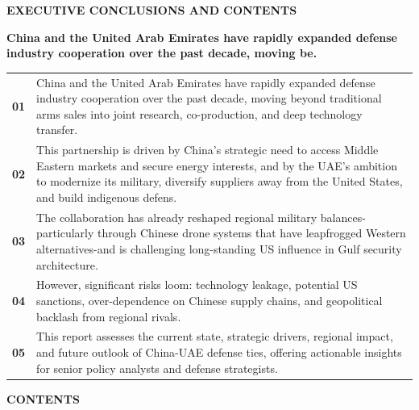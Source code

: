 \documentclass[10pt,a4paper]{article}
\begin{document}
{\textcolor{BOBlue}{\scriptsize\bfseries EXECUTIVE CONCLUSIONS AND CONTENTS}}\par\vspace{-1pt}
{\Large\sffamily\bfseries\color{BONavy} China and the United Arab Emirates have rapidly expanded defense industry cooperation over the past decade, moving be.}\par\vspace{4pt}
\vspace{2pt}{\color{BOBright}\rule{\linewidth}{1pt}}\vspace{5pt}
\begin{tabularx}{\linewidth}{p{12mm}Y}
\textcolor{BOBlue}{\bfseries 01} & {\footnotesize China and the United Arab Emirates have rapidly expanded defense industry cooperation over the past decade, moving beyond traditional arms sales into joint research, co-production, and deep technology transfer.} \\[4pt]
\textcolor{BOBlue}{\bfseries 02} & {\footnotesize This partnership is driven by China's strategic need to access Middle Eastern markets and secure energy interests, and by the UAE's ambition to modernize its military, diversify suppliers away from the United States, and build indigenous defens.} \\[4pt]
\textcolor{BOBlue}{\bfseries 03} & {\footnotesize The collaboration has already reshaped regional military balances-particularly through Chinese drone systems that have leapfrogged Western alternatives-and is challenging long-standing US influence in Gulf security architecture.} \\[4pt]
\textcolor{BOBlue}{\bfseries 04} & {\footnotesize However, significant risks loom: technology leakage, potential US sanctions, over-dependence on Chinese supply chains, and geopolitical backlash from regional rivals.} \\[4pt]
\textcolor{BOBlue}{\bfseries 05} & {\footnotesize This report assesses the current state, strategic drivers, regional impact, and future outlook of China-UAE defense ties, offering actionable insights for senior policy analysts and defense strategists.} \\[4pt]
\end{tabularx}
\vspace{6pt}
{\textcolor{BOBlue}{\scriptsize\bfseries CONTENTS}}\par\vspace{2pt}
\end{document}
